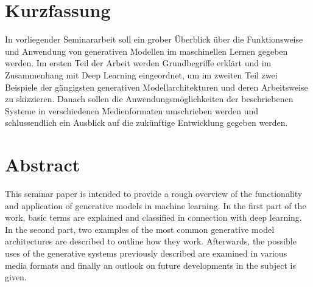 \section*{Kurzfassung}

In vorliegender Seminararbeit soll ein grober Überblick über die Funktionsweise und Anwendung von generativen Modellen im maschinellen Lernen gegeben werden. Im ersten Teil der Arbeit werden Grundbegriffe erklärt und im Zusammenhang mit Deep Learning eingeordnet, um im zweiten Teil zwei Beispiele der gängigsten generativen Modellarchitekturen und deren Arbeitsweise zu skizzieren. Danach sollen die Anwendungsmöglichkeiten der beschriebenen Systeme in verschiedenen Medienformaten umschrieben werden und schlussendlich ein Ausblick auf die zukünftige Entwicklung gegeben werden.

\section*{Abstract}

This seminar paper is intended to provide a rough overview of the functionality and application of generative models in machine learning. In the first part of the work, basic terms are explained and classified in connection with deep learning. In the second part, two examples of the most common generative model architectures are described to outline how they work. Afterwards, the possible uses of the generative systems previously described are examined in various media formats and finally an outlook on future developments in the subject is given.
